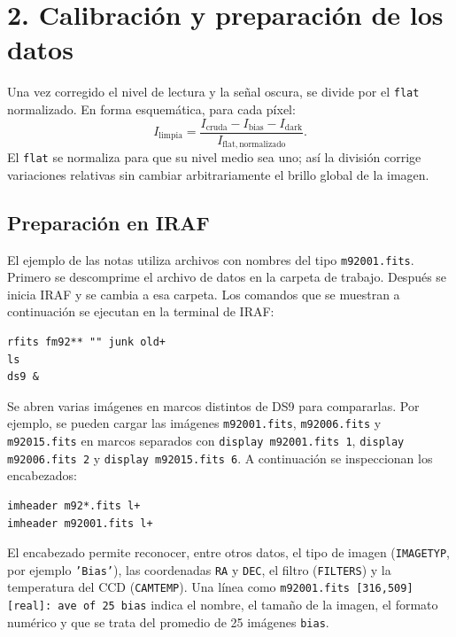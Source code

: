 \documentclass[11pt]{article}
\begin{document}
\newpage
\section*{2. Calibración y preparación de los datos}

Una vez corregido el nivel de lectura y la señal oscura, se divide por el
\texttt{flat} normalizado. En forma esquemática, para cada píxel:
\[
  I_{\mathrm{limpia}} =
  \frac{I_{\mathrm{cruda}}-I_{\mathrm{bias}}-I_{\mathrm{dark}}}
       {I_{\mathrm{flat, normalizado}}}.
\]
El \texttt{flat} se normaliza para que su nivel medio sea uno; así la división
corrige variaciones relativas sin cambiar arbitrariamente el brillo global de
la imagen.

\begin{center}
  
\end{center}

\subsection*{Preparación en IRAF}
El ejemplo de las notas utiliza archivos con nombres del tipo
\texttt{m92001.fits}. Primero se descomprime el archivo de datos en la carpeta
de trabajo. Después se inicia IRAF y se cambia a esa carpeta. Los comandos que
se muestran a continuación se ejecutan en la terminal de IRAF:

\begin{verbatim}
rfits fm92** "" junk old+
ls
ds9 &
\end{verbatim}

Se abren varias imágenes en marcos distintos de DS9 para compararlas. Por
ejemplo, se pueden cargar las imágenes \texttt{m92001.fits},
\texttt{m92006.fits} y \texttt{m92015.fits} en marcos separados con
\texttt{display m92001.fits 1}, \texttt{display m92006.fits 2} y
\texttt{display m92015.fits 6}. A continuación se inspeccionan los encabezados:

\begin{verbatim}
imheader m92*.fits l+
imheader m92001.fits l+
\end{verbatim}

El encabezado permite reconocer, entre otros datos, el tipo de imagen
(\texttt{IMAGETYP}, por ejemplo \texttt{'Bias'}), las coordenadas
\texttt{RA} y \texttt{DEC}, el filtro (\texttt{FILTERS}) y la temperatura del
CCD (\texttt{CAMTEMP}). Una línea como
\texttt{m92001.fits [316,509][real]: ave of 25 bias} indica el nombre, el
tamaño de la imagen, el formato numérico y que se trata del promedio de 25
imágenes \texttt{bias}.
\end{document}
